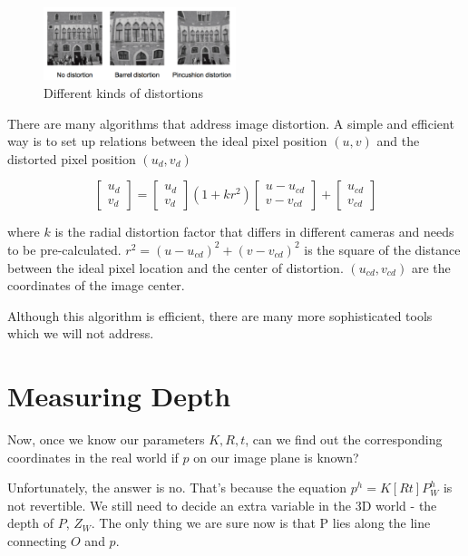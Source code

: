 \documentclass[]{article}
\begin{document}
\begin{figure}[H]
\includegraphics[width=0.5\textwidth]{distortion.png}
\centering
\caption{Different kinds of distortions}
\label{fig:distortion}
\end{figure}

There are many algorithms that address image distortion. A simple and efficient way is to set up relations between the ideal pixel position $(u,v)$ and the distorted pixel position $(u_d,v_d)$

\begin{equation}
\begin{bmatrix}
    u_d \\
    v_d
\end{bmatrix}
=
\begin{bmatrix}
    u_d \\
    v_d
\end{bmatrix}
(1+kr^2)
\begin{bmatrix}
    u-u_{cd} \\
    v-v_{cd}
\end{bmatrix}
+
\begin{bmatrix}
    u_{cd} \\
    v_{cd}
\end{bmatrix}
\end{equation}

where $k$ is the radial distortion factor that differs in different cameras and needs to be pre-calculated. $r^2=(u-u_{cd})^2+(v-v_{cd})^2$ is the square of the distance between the ideal pixel location and the center of distortion. $(u_{cd},v_{cd})$ are the coordinates of the image center.

Although this algorithm is efficient, there are many more sophisticated tools which we will not address.

\section{Measuring Depth}
Now, once we know our parameters $K,R,t$, can we find out the corresponding coordinates in the real world if $p$ on our image plane is known?

Unfortunately, the answer is no. That's because the equation $p^h=K[R t]P_W^h$ is not revertible. We still need to decide an extra variable in the 3D world - the depth of $P$, $Z_W$. The only thing we are sure now is that P lies along the line connecting $O$ and $p$.
\end{document}
